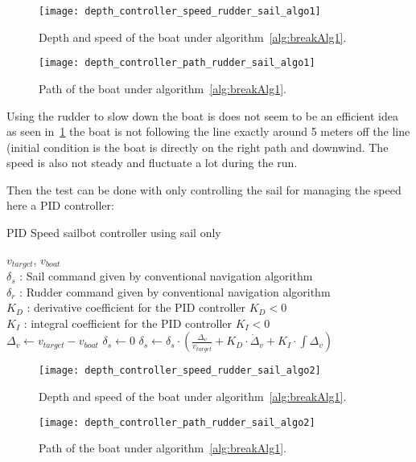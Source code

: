 \begin{figure}[H]
\centering
    \begin{minipage}[b]{0.4\textwidth}
    \centering
    \texttt{[image: depth\_controller\_speed\_rudder\_sail\_algo1]}
    \caption{Depth and speed of the boat under algorithm~\ref{alg:breakAlg1}.}
    \label{fig: algo1Depth}
    \end{minipage}
    \hfill
    \begin{minipage}[b]{0.45\textwidth}
    \centering
    \texttt{[image: depth\_controller\_path\_rudder\_sail\_algo1]}
    \caption{Path of the boat under algorithm~\ref{alg:breakAlg1}.}
    \label{fig:algo1Path}
    \end{minipage}
\end{figure}
 
Using the rudder to slow down the boat is does not seem to be an efficient idea as seen in~\ref{fig:algo1Path} the boat is not following the line exactly around 5 meters off the line (initial condition is the boat is directly on the right path and downwind. The speed is also not steady and fluctuate a lot during the run.

 Then the test can be done with only controlling the sail for managing the speed here a PID controller:


\begin{algorithm}[H]
\caption{PID Speed sailbot controller using sail only}
\label{alg:breakAlg2}
\begin{algorithmic}[1]
\REQUIRE $v_{target}$, $v_{boat}$\\
   $\delta_s$ : Sail command given by conventional navigation algorithm\\
   $\delta_r$ : Rudder command given by conventional navigation algorithm\\
   $K_D$ : derivative coefficient for the PID controller $ K_D < 0$\\
   $K_I$ : integral coefficient for the PID controller $ K_I < 0$\\
\STATE $\Delta_{v} \leftarrow v_{target} - v_{boat}$
\STATE $\delta_s \leftarrow 0$
\ELSE
{}
\STATE $\delta_s \leftarrow \delta_s \cdot (\frac{\Delta_v}{v_{target}} + K_D \cdot \dot{\Delta}_v + K_I \cdot \displaystyle \int \Delta_v )$
\ENDIF
\ENDIF
\end{algorithmic}
\end{algorithm}

\begin{figure}[H]
\centering
    \begin{minipage}[b]{0.4\textwidth}
    \centering
    \texttt{[image: depth\_controller\_speed\_rudder\_sail\_algo2]}
    \caption{Depth and speed of the boat under algorithm~\ref{alg:breakAlg1}.}
    \label{fig: algo2Depth}
    \end{minipage}
    \hfill
    \begin{minipage}[b]{0.45\textwidth}
    \centering
    \texttt{[image: depth\_controller\_path\_rudder\_sail\_algo2]}
    \caption{Path of the boat under algorithm~\ref{alg:breakAlg1}.}
    \label{fig:algo2Path}
    \end{minipage}
\end{figure}

